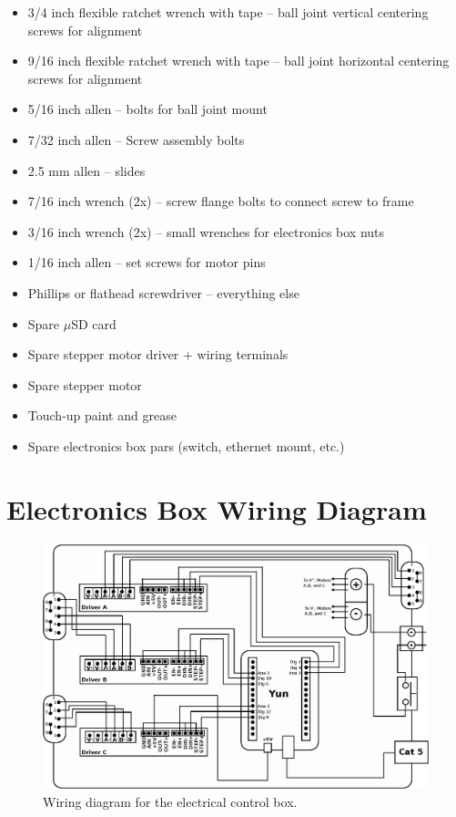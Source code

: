 \documentclass[11pt]{article}
\begin{document}
\begin{itemize}
	\item 3/4 inch flexible ratchet wrench with tape -- ball joint vertical centering screws for alignment
	\item 9/16 inch flexible ratchet wrench with tape -- ball joint horizontal centering screws for alignment
	\item 5/16 inch allen -- bolts for ball joint mount
	\item 7/32 inch allen -- Screw assembly bolts
	\item 2.5 mm allen -- slides
	\item 7/16 inch wrench (2x) -- screw flange bolts to connect screw to frame
	\item 3/16 inch wrench (2x) -- small wrenches for electronics box nuts
	\item 1/16 inch allen -- set screws for motor pins
	\item Phillips or flathead screwdriver -- everything else
	\item Spare $\mu$SD card
	\item Spare stepper motor driver + wiring terminals
	\item Spare stepper motor
	\item Touch-up paint and grease
	\item Spare electronics box pars (switch, ethernet mount, etc.)
\end{itemize}


\section{Electronics Box Wiring Diagram}
\begin{figure}[h]
\begin{center}
\includegraphics[width = 5.5in]{wiringDrawingUpdate.eps}
\caption{Wiring diagram for the electrical control box.}  
\label{fd2}
\end{center}
\end{figure}
\end{document}
